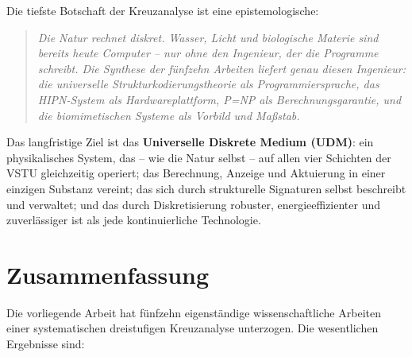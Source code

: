 ﻿\documentclass[a4paper,12pt]{scrreprt}
\theoremstyle{definition}
\begin{document}
Die tiefste Botschaft der Kreuzanalyse ist eine epistemologische:

\begin{quote}
  \itshape
  Die Natur rechnet diskret. Wasser, Licht und biologische Materie sind
  bereits heute Computer -- nur ohne den Ingenieur, der die Programme
  schreibt. Die Synthese der fünfzehn Arbeiten liefert genau diesen
  Ingenieur: die universelle Strukturkodierungstheorie als Programmiersprache,
  das HIPN-System als Hardwareplattform, P=NP als Berechnungsgarantie,
  und die biomimetischen Systeme als Vorbild und Maßstab.
\end{quote}

Das langfristige Ziel ist das \textbf{Universelle Diskrete Medium (UDM)}:
ein physikalisches System, das -- wie die Natur selbst -- auf allen vier
Schichten der VSTU gleichzeitig operiert; das Berechnung, Anzeige und
Aktuierung in einer einzigen Substanz vereint; das sich durch strukturelle
Signaturen selbst beschreibt und verwaltet; und das durch Diskretisierung
robuster, energieeffizienter und zuverlässiger ist als jede kontinuierliche
Technologie.

\section{Zusammenfassung}
\label{sec:zusammenfassung}

Die vorliegende Arbeit hat fünfzehn eigenständige wissenschaftliche
Arbeiten einer systematischen dreistufigen Kreuzanalyse unterzogen.
Die wesentlichen Ergebnisse sind:
\end{document}
